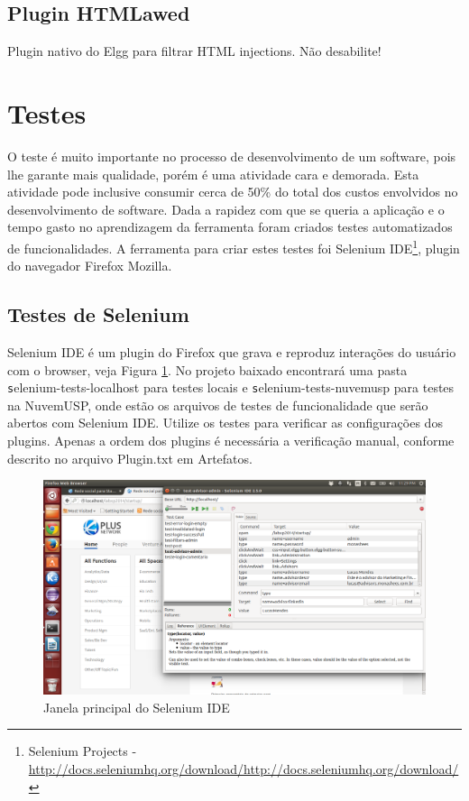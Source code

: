 \documentclass[12pt, letterpaper, onecolumn]{article}
\begin{document}
\subsection{Plugin HTMLawed}
Plugin nativo do Elgg para filtrar HTML injections. Não desabilite!


\section{Testes}
O teste é muito importante no processo de desenvolvimento de um software, pois lhe garante mais qualidade, porém é uma atividade cara e demorada. Esta atividade pode inclusive consumir cerca de 50\% do total dos custos envolvidos no desenvolvimento de software. Dada a rapidez com que se queria a aplicação e o tempo gasto no aprendizagem da ferramenta foram criados testes automatizados de funcionalidades. A ferramenta para criar estes testes foi Selenium IDE\footnote{Selenium Projects - \url{http://docs.seleniumhq.org/download/http://docs.seleniumhq.org/download/}}, plugin do navegador Firefox Mozilla.

\subsection{Testes de Selenium}
Selenium IDE é um plugin do Firefox que grava e reproduz interações do usuário com o browser, veja Figura \ref{fig:Selenium}. No projeto baixado encontrará uma pasta {\texttt selenium-tests-localhost} para testes locais e {\texttt selenium-tests-nuvemusp} para testes na NuvemUSP, onde estão os arquivos de testes de funcionalidade que serão abertos com Selenium IDE. Utilize os testes para verificar as configurações dos plugins. Apenas a ordem dos plugins é necessária a verificação manual, conforme descrito no arquivo Plugin.txt em Artefatos.

\begin{figure}[htpb]
\centering
\includegraphics[scale=.325]{images/selenium.png}
\caption{Janela principal do Selenium IDE}
\label{fig:Selenium}
\end{figure}
\end{document}
